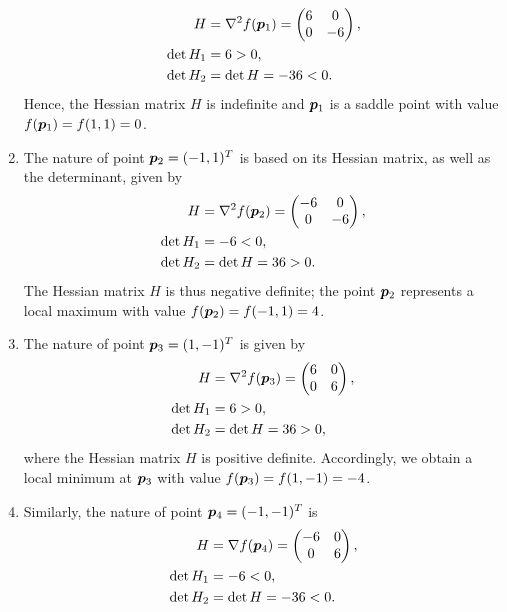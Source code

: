 \documentclass
[answers]
{exercise_sheet}
\begin{document}
\begin{Answer}{35}
\begin{enumerate}
\begin{align*}
H & = \nabla^2 f (\bm{p}_1) = \begin{pmatrix}
	6 & 0 \\
	0 & -6
\end{pmatrix} , \\
\det{H_1} &= 6 > 0 , \\
\det{H_2} &= \det{H} = -36 < 0 .
\end{align*}
Hence, the Hessian matrix $H$ is indefinite and $\bm{p}_1$ is a saddle point with value $f(\bm{p}_1) = f(1, 1) = 0$.
\item The nature of point $\bm{p}_2 = (-1, 1)^T$ is based on its Hessian matrix, as well as the determinant, given by
\begin{align*}
H & = \nabla^2 f (\bm{p}_2) = \begin{pmatrix}
	-6 & 0 \\
	0 & -6 
\end{pmatrix} , \\
\det{H_1} &= -6 < 0, \\
\det{H_2} &= \det{H} = 36 > 0 .
\end{align*}
The Hessian matrix $H$ is thus negative definite; the point $\bm{p}_2$ represents a local maximum with value $f(\bm{p}_2) = f(-1, 1) = 4$.
\item The nature of point $\bm{p}_3= (1,-1)^T$ is given by
\begin{align*}
H & = \nabla^2 f (\bm{p}_3) = \begin{pmatrix}
	6 & 0 \\
	0 & 6 
\end{pmatrix} , \\
\det{H_1} &= 6 > 0 , \\
\det{H_2} &= \det{H} = 36 > 0 ,
\end{align*}
where the Hessian matrix $H$ is positive definite. Accordingly, we obtain a local minimum at $\bm{p}_3$ with value $f(\bm{p}_3) = f(1, -1) = -4$.
\item Similarly, the nature of point $\bm{p}_4 = (-1,-1)^T$ is
\begin{align*}
H & = \nabla f (\bm{p}_4) = \begin{pmatrix}
	-6 & 0 \\
	0 & 6 
\end{pmatrix} , \\
\det{H_1} &= -6 < 0 , \\
\det{H_2} &= \det{H} = -36 < 0 .
\end{align*}

\end{enumerate}
\end{Answer}
\end{document}
